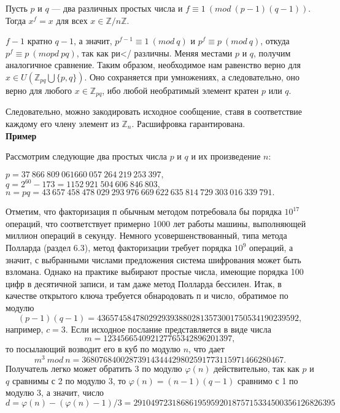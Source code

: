 \documentclass{mai_book}
\begin{document}
  Пусть $p$ и $q$ --- два различных простых числа и $f \equiv 1\ (mod\ (p-1)(q-1))$. Тогда $x^{f} = x$ для всех $x \in \mathbb{Z}/n\mathbb{Z}$.
\pagebreak
\newpage
\begin{myproof}
$f - 1$ кратно $q - 1$, а значит, $p^{f - 1} \equiv 1\ (mod\ q)$ и $p^f \equiv p\ (mod\ q)$, откуда $p^f \equiv p\ (mopd\ pq)$, так как ри</ различны. Меняя местами $p$ и $q$, получим аналогичное сравнение. Таким образом, необходимое
нам равенство верно для $x \in U(\mathbb{Z}_{pq} \bigcup \{p,q \})$. Оно сохраняется при умножениях, а следовательно, оно верно для любого $x \in \mathbb{Z}_{pq}$, ибо любой необратимый элемент кратен $p$ или $q$.
\end{myproof}
  Следовательно, можно закодировать исходное сообщение, ставя в
соответствие каждому его члену элемент из $\mathbb{Z}_n$. Расшифровка 
гарантирована.\\
\textbf{Пример} \par
  Рассмотрим следующие два простых числа $p$ и $q$ и их произведение $n$:
\begin{center}
$p = 37\ 866\ 809\ 061660\ 057\ 264\ 219\ 253\ 397,$ 
$q = 2^{60} - 173 = 1152\ 921\ 504\ 606\ 846\ 803,$ 
$n = pq = 43\ 657\ 458\ 478\ 029\ 293\ 976\ 669\ 622\ 635\ 814\ 729\ 303\ 016\ 339\ 791.$
\end{center}
Отметим, что факторизация п обычным методом потребовала бы 
порядка $10^{17}$ операций, что соответствует примерно 1000 лет работы 
машины, выполняющей миллион операций в секунду. Немного 
усовершенствованный, типа метода Полларда (раздел 6.3), метод факторизации
требует порядка $10^9$ операций, а значит, с выбранными числами 
предложения система шифрования может быть взломана. Однако на практике
выбирают простые числа, имеющие порядка 100 цифр в десятичной 
записи, и там даже метод Полларда бессилен. Итак, в качестве открытого
ключа требуется обнародовать п и число, обратимое по модулю
$$(p - 1)(q - 1) = 43 657 458 478 029 293 938 802 813 573 001750 534 190 239 592,$$
например, $c = 3$. Если исходное послание представляется в виде числа
$$m = 123 456 654 092127 765 342 896 201397,$$
то посылающий возводит его в куб по модулю $n$, что дает
$$m^{3}\ mod\ n = 36 807 684 002 873 914 344 429 802 591 773 115 971466 280 467.$$
Получатель легко может обратить 3 по модулю $\varphi (n)$ действительно,
так как $p$ и $q$ сравнимы с 2 по модулю 3, то $\varphi (n) = (n - 1)(q - 1)$
сравнимо с 1 по модулю 3, а значит, число
$$d = \varphi (n) - (\varphi (n) - 1)/3 = 29104 972 318 686 195 959 201875 715 334 500 356 126 826 395$$
\pagebreak
\newpage
\end{document}
